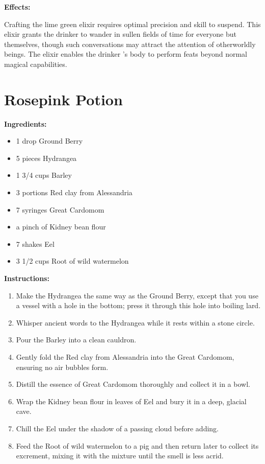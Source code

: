 \documentclass{article}
\begin{document}
\textbf{Effects:}

Crafting the lime green elixir requires optimal precision and skill to suspend. This elixir grants the drinker to wander in sullen fields of time for everyone but themselves, though such conversations may attract the attention of otherworldly beings. The elixir enables the drinker 's body to perform feats beyond normal magical capabilities.

\newpage
\section*{Rosepink Potion}

\textbf{Ingredients:}

\begin{itemize}
  \item 1 drop Ground Berry
  \item 5 pieces Hydrangea
  \item 1 3/4 cups Barley
  \item 3 portions Red clay from Alessandria
  \item 7 syringes Great Cardomom
  \item a pinch of Kidney bean flour
  \item 7 shakes Eel
  \item 3 1/2 cups Root of wild watermelon
\end{itemize}

\textbf{Instructions:}

\begin{enumerate}
  \item Make the Hydrangea the same way as the Ground Berry, except that you use a vessel with a hole in the bottom; press it through this hole into boiling lard.
  \item Whisper ancient words to the Hydrangea while it rests within a stone circle.
  \item Pour the Barley into a clean cauldron.
  \item Gently fold the Red clay from Alessandria into the Great Cardomom, ensuring no air bubbles form.
  \item Distill the essence of Great Cardomom thoroughly and collect it in a bowl.
  \item Wrap the Kidney bean flour in leaves of Eel and bury it in a deep, glacial cave.
  \item Chill the Eel under the shadow of a passing cloud before adding.
  \item Feed the Root of wild watermelon to a pig and then return later to collect its excrement, mixing it with the mixture until the smell is less acrid.
\end{enumerate}
\end{document}
